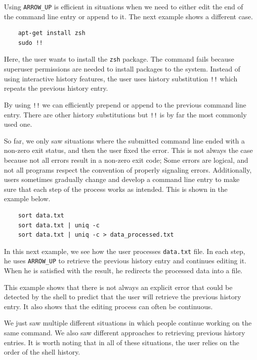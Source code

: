 Using \verb|ARROW_UP| is efficient in situations when we need to either edit the end of the command line entry or append to it.
The next example shows a different case.

\begin{verbatim}
    apt-get install zsh
    sudo !!
\end{verbatim}

Here, the user wants to install the \verb|zsh| package. The command fails because superuser permissions are needed to install packages to the system. Instead of using interactive history features, the user uses history substitution \verb|!!| which repeats the previous history entry. 

By using \verb|!!| we can efficiently prepend or append to the previous command line entry. There are other history substitutions but \verb|!!| is by far the most commonly used one. 

So far, we only saw situations where the submitted command line ended with a non-zero exit status, and then the user fixed the error. This is not always the case because not all errors result in a non-zero exit code; Some errors are logical, and not all programs respect the convention of properly signaling errors. Additionally, users sometimes gradually change and develop a command line entry to make sure that each step of the process works as intended. This is shown in the example below.

\begin{verbatim}
    sort data.txt
    sort data.txt | uniq -c
    sort data.txt | uniq -c > data_processed.txt
\end{verbatim}

In this next example, we see how the user processes \verb|data.txt| file. In each step, he uses \verb|ARROW_UP| to retrieve the previous history entry and continues editing it. When he is satisfied with the result, he redirects the processed data into a file. 

This example shows that there is not always an explicit error that could be detected by the shell to predict that the user will retrieve the previous history entry. It also shows that the editing process can often be continuous.

We just saw multiple different situations in which people continue working on the same command. We also saw different approaches to retrieving previous history entries. It is worth noting that in all of these situations, the user relies on the order of the shell history. 


